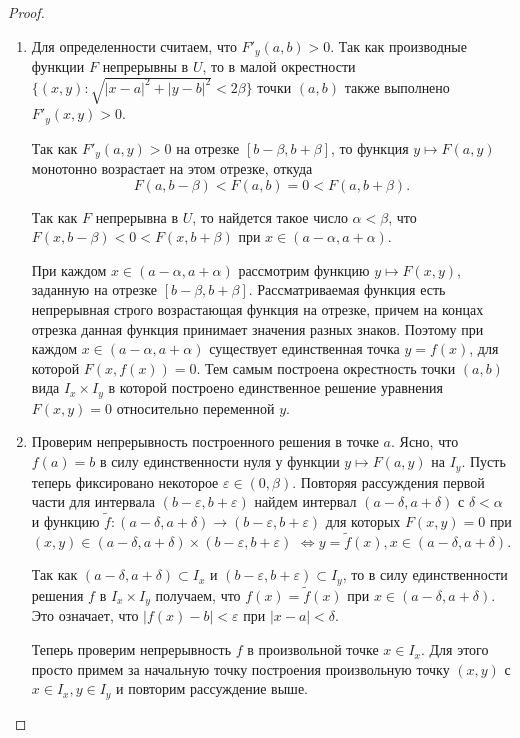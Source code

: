 \documentclass[a4paper]{article}
\theoremstyle{named}
\begin{document}
    \begin{proof}~
    
        \begin{enumerate}
        \item
            Для определенности считаем, что $F'_y(a,b)>0$. Так как производные функции $F$ непрерывны в $U$, то в малой окрестности
            $\{(x,y)\colon \sqrt{|x-a|^2+|y-b|^2}<2\beta\}$ точки $(a,b)$ также выполнено $F'_y(x,y)>0$. 
            
            Так как $F'_y(a,y)>0$ на отрезке $[b-\beta, b+\beta]$, то функция $y\mapsto F(a,y)$
            монотонно возрастает на этом отрезке, откуда $$F(a, b-\beta)<F(a,b)=0<F(a,b+\beta).$$

            Так как $F$ непрерывна в $U$, то найдется такое число $\alpha<\beta$, что $F(x,b-\beta)<0<F(x,b+\beta)$ при $x\in(a-\alpha, a+\alpha)$.

            При каждом $x\in(a-\alpha, a+\alpha)$ рассмотрим функцию $y\mapsto F(x,y)$, заданную на отрезке $[b-\beta, b+\beta]$. Рассматриваемая функция есть непрерывная строго возрастающая функция на отрезке, причем на концах отрезка данная функция принимает значения разных знаков. Поэтому при каждом $x\in (a-\alpha, a+\alpha)$ существует единственная точка $y=f(x)$, для которой $F(x, f(x))=0$. Тем самым построена окрестность точки $(a,b)$ вида $I_x\times I_y$ в которой построено единственное решение уравнения $F(x,y)=0$ относительно переменной $y$.

        \item
            Проверим непрерывность построенного решения в точке $a$. Ясно, что $f(a)=b$ в силу единственности нуля у функции $y\mapsto F(a,y)$ на $I_y$. Пусть теперь фиксировано некоторое $\varepsilon\in(0,\beta)$. Повторяя рассуждения первой части для интервала $(b-\varepsilon, b+\varepsilon)$ найдем интервал $(a-\delta, a+\delta)$ с $\delta<\alpha$ и функцию $\tilde{f}\colon (a-\delta, a+\delta)\to(b-\varepsilon, b+\varepsilon)$ для которых $F(x,y)=0$ при $(x,y)\in (a-\delta, a+\delta)\times(b-\varepsilon, b+\varepsilon)$ $\Leftrightarrow y=\tilde{f}(x), x\in (a-\delta, a+\delta)$.

            Так как $(a-\delta, a+\delta)\subset I_x$ и $(b-\varepsilon, b+\varepsilon)\subset I_y$, то в силу единственности решения $f$ в $I_x\times I_y$ получаем, что $f(x)=\tilde{f}(x)$ при $x\in (a-\delta, a+\delta)$. Это означает, что $|f(x)-b|<\varepsilon$ при $|x-a|<\delta$.

            Теперь проверим непрерывность $f$ в произвольной точке $x\in I_x$. Для этого просто примем за начальную точку построения
            произвольную точку $(x,y)$ с $x\in I_x, y\in I_y$ и повторим рассуждение выше.


\end{enumerate}
\end{proof}
\end{document}

